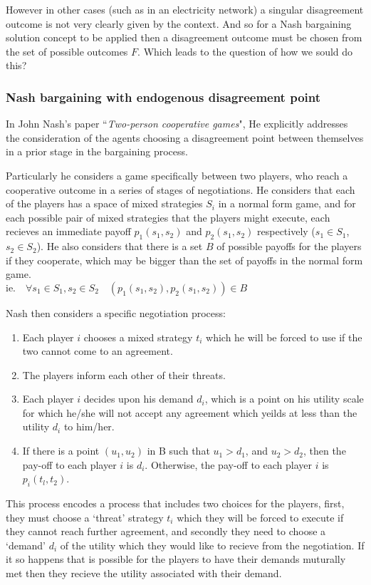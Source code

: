 However in other cases (such as in an electricity network) a singular disagreement outcome is not very clearly given by the context.
And so for a Nash bargaining solution concept to be applied then a disagreement outcome must be chosen from the set of possible outcomes $F$.
Which leads to the question of how we sould do this?

\subsubsection{Nash bargaining with endogenous disagreement point}

In John Nash's paper ``\textit{Two-person cooperative games}"\cite{nash2}, He explicitly addresses the consideration of the agents choosing a disagreement point between themselves in a prior stage in the bargaining process.

Particularly he considers a game specifically between two players, who reach a cooperative outcome in a series of stages of negotiations.
He considers that each of the players has a space of mixed strategies $S_i$ in a normal form game, and for each possible pair of mixed strategies that the players might execute, each recieves an immediate payoff $p_1(s_1,s_2)$ and $p_2(s_1,s_2)$ respectively ($s_1\in S_1$, $s_2\in S_2$).
He also considers that there is a set $B$ of possible payoffs for the players if they cooperate, which may be bigger than the set of payoffs in the normal form game.\\
$\text{ie.}\quad \forall s_1\in S_1,s_2\in S_2 \quad (p_1(s_1,s_2), p_2(s_1,s_2)) \in B$

Nash then considers a specific negotiation process:
\begin{enumerate}
\item Each player $i$ chooses a mixed strategy $t_i$ which he will be forced to use if the two cannot come to an agreement.
\item The players inform each other of their threats.
\item Each player $i$ decides upon his demand $d_i$, which is a point on his utility scale for which he/she will not accept any agreement which yeilds at less than the utility $d_i$ to him/her.
\item If there is a point $(u_1,u_2)$ in B such that $u_1 > d_1$, and $u_2 > d_2$, then the pay-off to each player $i$ is $d_i$. Otherwise, the pay-off to each player $i$ is $p_i(t_l, t_2)$.
\end{enumerate}

This process encodes a process that includes two choices for the players, first, they must choose a `threat' strategy $t_i$ which they will be forced to execute if they cannot reach further agreement, and secondly they need to choose a `demand' $d_i$ of the utility which they would like to recieve from the negotiation.
If it so happens that is possible for the players to have their demands muturally met then they recieve the utility associated with their demand.


